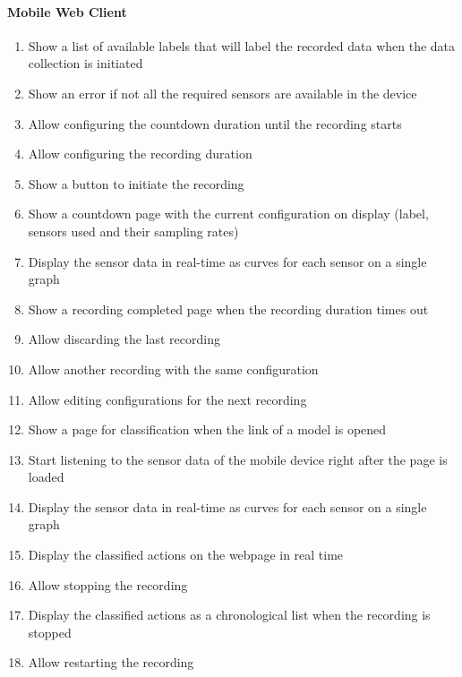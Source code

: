 \paragraph{Mobile Web Client}
\begin{enumerate}[resume*]
    \item \label{itm:conf-rec-label}Show a list of available labels that will label the recorded data when the data collection is initiated
    \item \label{itm:conf-rec-nosensor}Show an error if not all the required sensors are available in the device
    \item \label{itm:conf-rec-count}Allow configuring the countdown duration until the recording starts
    \item \label{itm:conf-rec-dur}Allow configuring the recording duration
    \item \label{itm:init-rec-button}Show a button to initiate the recording
    \item \label{itm:init-rec-countdown}Show a countdown page with the current configuration on display (label, sensors used and their sampling rates)
    \item \label{itm:init-rec-realtime}Display the sensor data in real-time as curves for each sensor on a single graph
    \item \label{itm:init-rec-completed}Show a recording completed page when the recording duration times out
    \item \label{itm:discard-record}Allow discarding the last recording
    \item \label{itm:next-record1}Allow another recording with the same configuration
    \item \label{itm:next-record2}Allow editing configurations for the next recording
    \item \label{itm:show-classification}Show a page for classification when the link of a model is opened
    \item \label{itm:start-listening}Start listening to the sensor data of the mobile device right after the page is loaded
    \item \label{itm:display-sensor}Display the sensor data in real-time as curves for each sensor on a single graph
    \item \label{itm:diplay-classified}Display the classified actions on the webpage in real time
    \item \label{itm:stop-recording}Allow stopping the recording
    \item \label{itm:display-recording-chrono}Display the classified actions as a chronological list when the recording is stopped
    \item \label{itm:restart-recording}Allow restarting the recording
\end{enumerate}

